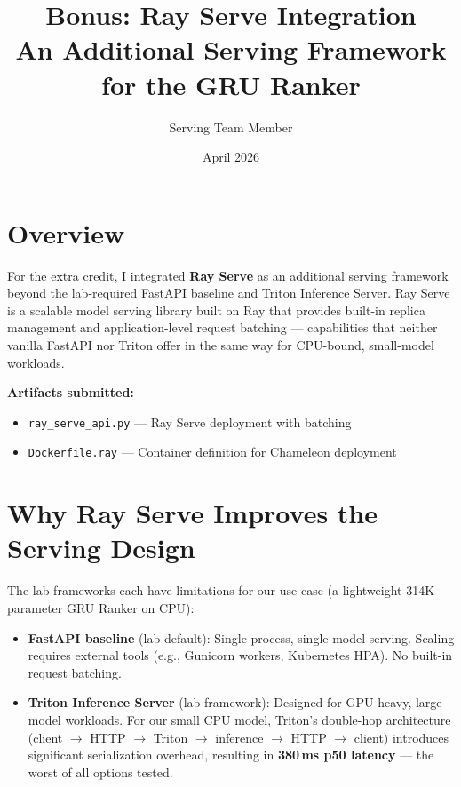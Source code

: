 \documentclass[11pt]{article}
\title{\textbf{Bonus: Ray Serve Integration} \\ \large An Additional Serving Framework for the GRU Ranker}
\author{Serving Team Member}
\date{April 2026}
\begin{document}
\maketitle

\section{Overview}

For the extra credit, I integrated \textbf{Ray Serve} as an additional serving framework beyond the lab-required FastAPI baseline and Triton Inference Server. Ray Serve is a scalable model serving library built on Ray that provides built-in replica management and application-level request batching --- capabilities that neither vanilla FastAPI nor Triton offer in the same way for CPU-bound, small-model workloads.

\medskip
\noindent\textbf{Artifacts submitted:}
\begin{itemize}[nosep]
  \item \texttt{ray\_serve\_api.py} --- Ray Serve deployment with batching
  \item \texttt{Dockerfile.ray} --- Container definition for Chameleon deployment
\end{itemize}

\section{Why Ray Serve Improves the Serving Design}

The lab frameworks each have limitations for our use case (a lightweight 314K-parameter GRU Ranker on CPU):

\begin{itemize}
  \item \textbf{FastAPI baseline} (lab default): Single-process, single-model serving. Scaling requires external tools (e.g., Gunicorn workers, Kubernetes HPA). No built-in request batching.
  \item \textbf{Triton Inference Server} (lab framework): Designed for GPU-heavy, large-model workloads. For our small CPU model, Triton's double-hop architecture (client $\to$ HTTP $\to$ Triton $\to$ inference $\to$ HTTP $\to$ client) introduces significant serialization overhead, resulting in \textbf{380\,ms p50 latency} --- the worst of all options tested.
\end{itemize}
\end{document}
